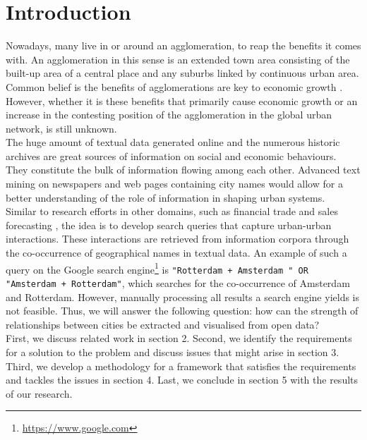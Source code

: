 \section{Introduction}

Nowadays, many live in or around an agglomeration, to reap the benefits it comes with. An agglomeration in this sense is an extended town area consisting of the built-up area of a central place and any suburbs linked by continuous urban area. Common belief is the benefits of agglomerations are key to economic growth \cite{porter2000location}. However, whether it is these benefits that primarily cause economic growth or an increase in the contesting position of the agglomeration in the global urban network, is still unknown. \\

The huge amount of textual data generated online and the numerous historic archives are great sources of information on social and economic behaviours. They constitute the bulk of information flowing among each other. Advanced text mining on newspapers and web pages containing city names would allow for a better understanding of the role of information in shaping urban systems.\\
Similar to research efforts in other domains, such as financial trade \cite{preis2013quantifying} and sales forecasting \cite{wu2014future}, the idea is to develop search queries that capture urban-urban interactions. These interactions are retrieved from information corpora through the co-occurrence of geographical names in textual data. An example of such a query on the Google search engine\footnote{\url{https://www.google.com}} is \texttt{"Rotterdam + Amsterdam " OR "Amsterdam + Rotterdam"}, which searches for the co-occurrence of Amsterdam and Rotterdam. However, manually processing all results a search engine yields is not feasible. Thus, we will answer the following question: 
how can the strength of relationships between cities be extracted and visualised from open data? \\

First, we discuss related work in section 2. Second, we identify the requirements for a solution to the problem and discuss issues that might arise in section 3. Third, we develop a methodology for a framework that satisfies the requirements and tackles the issues in section 4. Last, we conclude in section 5 with the results of our research.